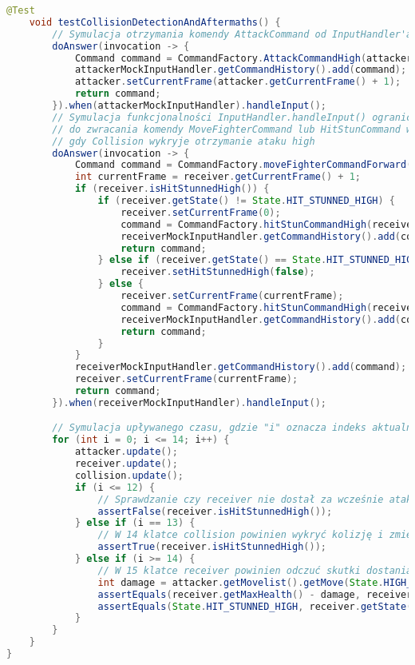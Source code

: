 \begin{lstlisting}[language=Java,style=JavaStyle,label=list:CollisionTest,caption=Test poprawnego wykrywania kolizji w klasie \texttt{Collision},
                   basicstyle=\footnotesize\ttfamily]
    @Test
    void testCollisionDetectionAndAftermaths() {
        // Symulacja otrzymania komendy AttackCommand od InputHandler'a
        doAnswer(invocation -> {
            Command command = CommandFactory.AttackCommandHigh(attacker);
            attackerMockInputHandler.getCommandHistory().add(command);
            attacker.setCurrentFrame(attacker.getCurrentFrame() + 1);
            return command;
        }).when(attackerMockInputHandler).handleInput();
        // Symulacja funkcjonalności InputHandler.handleInput() ograniczającej się
        // do zwracania komendy MoveFighterCommand lub HitStunCommand w przypadku,
        // gdy Collision wykryje otrzymanie ataku high
        doAnswer(invocation -> {
            Command command = CommandFactory.moveFighterCommandForward(receiver);
            int currentFrame = receiver.getCurrentFrame() + 1;
            if (receiver.isHitStunnedHigh()) {
                if (receiver.getState() != State.HIT_STUNNED_HIGH) {
                    receiver.setCurrentFrame(0);
                    command = CommandFactory.hitStunCommandHigh(receiver);
                    receiverMockInputHandler.getCommandHistory().add(command);
                    return command;
                } else if (receiver.getState() == State.HIT_STUNNED_HIGH && currentFrame >= receiver.getMovelist().getMove(State.HIT_STUNNED_HIGH.ordinal()).getFrameCount()) {
                    receiver.setHitStunnedHigh(false);
                } else {
                    receiver.setCurrentFrame(currentFrame);
                    command = CommandFactory.hitStunCommandHigh(receiver);
                    receiverMockInputHandler.getCommandHistory().add(command);
                    return command;
                }
            }
            receiverMockInputHandler.getCommandHistory().add(command);
            receiver.setCurrentFrame(currentFrame);
            return command;
        }).when(receiverMockInputHandler).handleInput();

        // Symulacja upływanego czasu, gdzie "i" oznacza indeks aktualnej klatki
        for (int i = 0; i <= 14; i++) {
            attacker.update();
            receiver.update();
            collision.update();
            if (i <= 12) {
                // Sprawdzanie czy receiver nie dostał za wcześnie atakiem
                assertFalse(receiver.isHitStunnedHigh());
            } else if (i == 13) {
                // W 14 klatce collision powinien wykryć kolizję i zmienić flagę isHitStunnedHigh na true
                assertTrue(receiver.isHitStunnedHigh());
            } else if (i >= 14) {
                // W 15 klatce receiver powinien odczuć skutki dostania atakiem high
                int damage = attacker.getMovelist().getMove(State.HIGH_ATTACK.getId()).getDamage();
                assertEquals(receiver.getMaxHealth() - damage, receiver.getHealth());
                assertEquals(State.HIT_STUNNED_HIGH, receiver.getState());
            }
        }
    }
}
\end{lstlisting}

